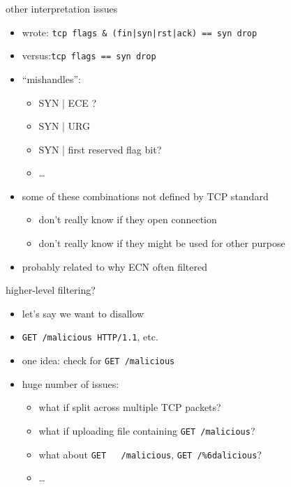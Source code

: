 \begin{frame}[fragile]{other interpretation issues}
\begin{itemize}
\item wrote: \verb+tcp flags & (fin|syn|rst|ack) == syn drop+
\item versus:\verb+tcp flags == syn drop+
\item ``mishandles'':
    \begin{itemize}
    \item SYN | ECE ?
    \item SYN | URG 
    \item SYN | first reserved flag bit?
    \item \ldots
    \end{itemize}
\item some of these combinations not defined by TCP standard
    \begin{itemize}
    \item don't really know if they open connection
    \item don't really know if they might be used for other purpose
    \end{itemize}
\item probably related to why ECN often filtered
\end{itemize}
\end{frame}

\begin{frame}[fragile]{higher-level filtering?}
    \begin{itemize}
    \item let's say we want to disallow
    \item \verb|GET /malicious HTTP/1.1|, etc.
    \vspace{.5cm}
    \item one idea: check for \verb|GET /malicious|
    \item huge number of issues:
        \begin{itemize}
        \item what if split across multiple TCP packets?
        \item what if uploading file containing \verb|GET /malicious|?
        \item what about \verb|GET   /malicious|, \verb|GET /%6dalicious|?
        \item \ldots
        \end{itemize}
    \end{itemize}
\end{frame}
